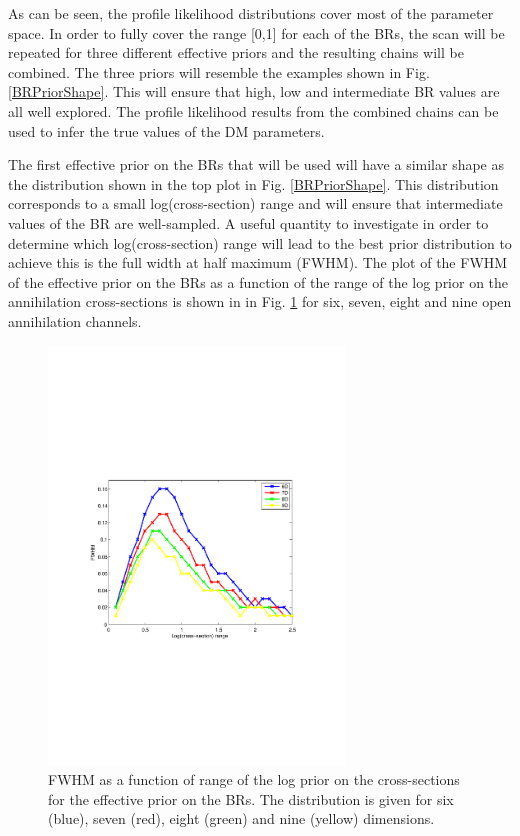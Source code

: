 \documentclass{article}
\begin{document}
As can be seen, the profile likelihood distributions cover most of the parameter space. In order to fully cover the range [0,1] for each of the BRs, the scan will be repeated for three different effective priors and the resulting chains will be combined. The three priors will resemble the examples shown in Fig. \ref{BRPriorShape}. This will ensure that high, low and intermediate BR values are all well explored. The profile likelihood results from the combined chains can be used to infer the true values of the DM parameters.

The first effective prior on the BRs that will be used will have a similar shape as the distribution shown in the top plot in Fig. \ref{BRPriorShape}. This distribution corresponds to a small log(cross-section) range and will ensure that intermediate values of the BR are well-sampled. A useful quantity to investigate in order to determine which log(cross-section) range will lead to the best prior distribution to achieve this is the full width at half maximum (FWHM). The plot of the FWHM of the effective prior on the BRs as a function of the range of the log prior on the annihilation cross-sections is shown in in Fig. \ref{FWHM_plot} for six, seven, eight and nine open annihilation channels.
\begin{figure}
\centering
\includegraphics[trim = 70 240 90 240, clip = true, width=0.7\textwidth]{figs/FWHM_vs_Range}
\caption{FWHM as a function of range of the log prior on the cross-sections for the effective prior on the BRs. The distribution is given for six (blue), seven (red), eight (green) and nine (yellow) dimensions.}
\label{FWHM_plot}
\end{figure}
\end{document}
